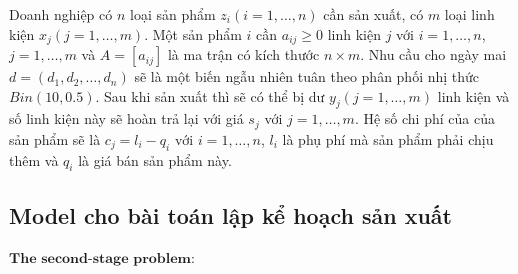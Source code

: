 \documentclass[a4paper]{article}
\begin{document}
    Doanh nghiệp có $n$ loại sản phẩm $z_i(i=1,\dots,n)$ cần sản xuất, có $m$ loại linh kiện $x_j(j=1,\dots,m)$. Một sản phẩm $i$ cần $a_{ij} \geq 0$ linh kiện $j$ với $i=1,\dots,n$, $j=1,\dots,m$ và $A=[a_{ij}]$ là ma trận có kích thước $n\times m$. Nhu cầu cho ngày mai $\textbf{$d$}=(d_1,d_2,\dots,d_n)$ sẽ là một biến ngẫu nhiên tuân theo phân phối nhị thức $Bin(10,0.5)$. Sau khi sản xuất thì sẽ có thể bị dư $y_j(j=1,\dots,m)$ linh kiện và số linh kiện này sẽ hoàn trả lại với giá $s_j$ với $j = 1,\dots,m$. Hệ số chi phí của của sản phẩm sẽ là $c_j= l_i-q_i \text{ với } i = 1,\dots,n$, $l_i$ là phụ phí mà sản phẩm phải chịu thêm và $q_i$ là giá bán sản phẩm này.
     

	\subsection{Model cho bài toán lập kể hoạch sản xuất}
    $\textbf{The second-stage problem:}$
    
\end{document}
